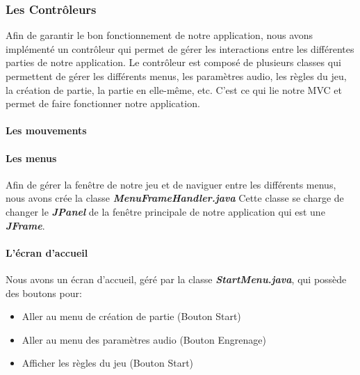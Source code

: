 \subsubsection{Les Contrôleurs}
\label{subsubsec:controleur}

Afin de garantir le bon fonctionnement de notre application, nous avons implémenté un contrôleur qui permet de gérer les interactions entre les différentes parties de notre application. Le contrôleur est composé de plusieurs classes qui permettent de gérer les différents menus, les paramètres audio, les règles du jeu, la création de partie, la partie en elle-même, etc. C'est ce qui lie notre MVC et permet de faire fonctionner notre application.

\paragraph{Les mouvements}


\paragraph{Les menus}

Afin de gérer la fenêtre de notre jeu et de naviguer entre les différents menus, nous avons crée la classe \textbf{\textit{MenuFrameHandler.java}} Cette classe se charge de changer le \textbf{\textit{JPanel}} de la fenêtre principale de notre application qui est une \textbf{\textit{JFrame}}.

\paragraph{L'écran d'accueil}

Nous avons un écran d'accueil, géré par la classe \textbf{\textit{StartMenu.java}}, qui possède des boutons pour:

\begin{itemize}
    \item Aller au menu de création de partie (Bouton Start)
    \item Aller au menu des paramètres audio (Bouton Engrenage)
    \item Afficher les règles du jeu (Bouton Start)
\end{itemize}


